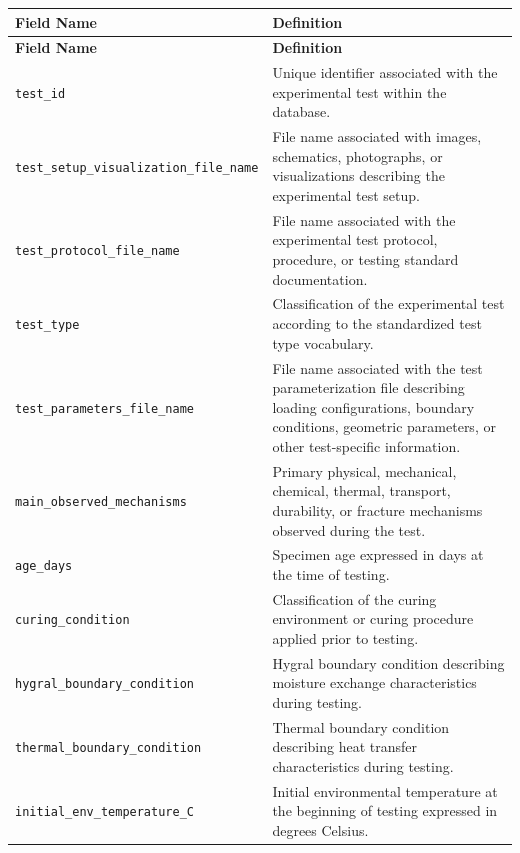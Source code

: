 \documentclass[11pt]{book}
\begin{document}
{\begin{longtable}{p{}p{}}
\hline
\textbf{Field Name} & \textbf{Definition} \\
\hline
\endfirsthead

\hline
\textbf{Field Name} & \textbf{Definition} \\
\hline
\endhead

\texttt{test\_id} &
Unique identifier associated with the experimental test within the database. \\

\texttt{test\_setup\_visualization\_file\_name} &
File name associated with images, schematics, photographs, or visualizations describing the experimental test setup. \\

\texttt{test\_protocol\_file\_name} &
File name associated with the experimental test protocol, procedure, or testing standard documentation. \\

\texttt{test\_type} &
Classification of the experimental test according to the standardized test type vocabulary. \\

\texttt{test\_parameters\_file\_name} &
File name associated with the test parameterization file describing loading configurations, boundary conditions, geometric parameters, or other test-specific information. \\

\texttt{main\_observed\_mechanisms} &
Primary physical, mechanical, chemical, thermal, transport, durability, or fracture mechanisms observed during the test. \\

\texttt{age\_days} &
Specimen age expressed in days at the time of testing. \\

\texttt{curing\_condition} &
Classification of the curing environment or curing procedure applied prior to testing. \\

\texttt{hygral\_boundary\_condition} &
Hygral boundary condition describing moisture exchange characteristics during testing. \\

\texttt{thermal\_boundary\_condition} &
Thermal boundary condition describing heat transfer characteristics during testing. \\

\texttt{initial\_env\_temperature\_C} &
Initial environmental temperature at the beginning of testing expressed in degrees Celsius. \\


\end{longtable}}
\end{document}
